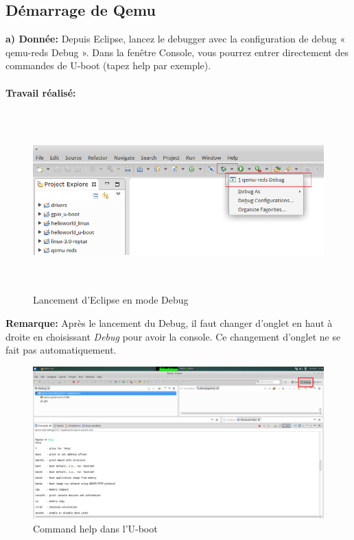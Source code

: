 \subsection{Démarrage de Qemu}
\textbf{a) Donnée: }Depuis Eclipse, lancez le debugger avec la configuration de debug « qemu-reds Debug ». Dans la
fenêtre Console, vous pourrez entrer directement des commandes de U-boot (tapez help par
exemple). \\\\
\textbf{Travail réalisé: }
\begin{figure}[H]
	\begin{center}
		\includegraphics[height=7cm]{img/manip2Intro.png}
		\caption{Lancement d'Eclipse en mode Debug}
		\label{eclipseDebug}
	\end{center}
\end{figure}
\textbf{Remarque: }Après le lancement du Debug, il faut changer d'onglet en haut à droite en choisissant \textit{Debug} pour avoir la console. Ce changement d'onglet ne se fait pas automatiquement.
\begin{figure}[H]
	\begin{center}
		\includegraphics[width=18cm]{img/ubootCommand.png}
		\caption{Command help dans l'U-boot}
		\label{ubootCommand}
	\end{center}
\end{figure}
